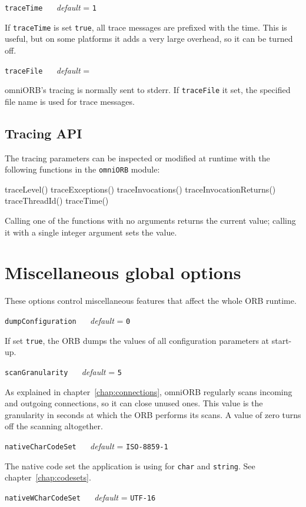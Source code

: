 \documentclass[11pt,oneside,a4paper]{book}
\makeatletter
\newcommand{\type}[1]{\texttt{#1}}
\newcommand{\code}[1]{\texttt{#1}}
\newcommand{\confopt}[2]
  {\vspace{\baselineskip}\par\noindent\code{#1} ~~ \textit{default} =
   \code{#2}}
\renewcommand{\confopt}[2]
  {\vspace{\baselineskip}\par\noindent\code{#1} ~~ \textit{default} =
   \code{#2}\\[-1ex]\@afterheading}
\makeatother
\begin{document}
\confopt{traceTime}{1}

If \code{traceTime} is set \code{true}, all trace messages are
prefixed with the time. This is useful, but on some platforms it adds
a very large overhead, so it can be turned off.


\confopt{traceFile}{}

omniORB's tracing is normally sent to stderr. If \code{traceFile} it
set, the specified file name is used for trace messages.


\subsection{Tracing API}

The tracing parameters can be inspected or modified at runtime with
the following functions in the \code{omniORB} module:

\begin{pylisting}
  traceLevel()
  traceExceptions()
  traceInvocations()
  traceInvocationReturns()
  traceThreadId()
  traceTime()
\end{pylisting}

\noindent
Calling one of the functions with no arguments returns the current
value; calling it with a single integer argument sets the value.



\section{Miscellaneous global options}

These options control miscellaneous features that affect the whole ORB
runtime.

\confopt{dumpConfiguration}{0}

If set \code{true}, the ORB dumps the values of all configuration
parameters at start-up.


\confopt{scanGranularity}{5}

As explained in chapter~\ref{chap:connections}, omniORB regularly
scans incoming and outgoing connections, so it can close unused
ones. This value is the granularity in seconds at which the ORB
performs its scans. A value of zero turns off the scanning altogether.


\confopt{nativeCharCodeSet}{ISO-8859-1}

The native code set the application is using for \type{char} and
\type{string}. See chapter~\ref{chap:codesets}.


\confopt{nativeWCharCodeSet}{UTF-16}
\end{document}
